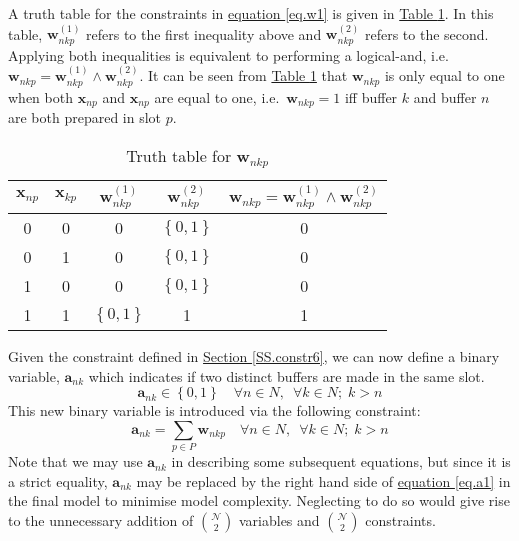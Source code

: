 A truth table for the constraints in 
\hyperref[eq.w1]{equation \ref*{eq.w1}} is given in
\hyperref[tbl.truthw]{Table \ref*{tbl.truthw}}.
In this table, $\boldsymbol{w}_{nkp}^{\left( 1 \right)}$ refers to the first
inequality above and $\boldsymbol{w}_{nkp}^{\left( 2 \right)}$ refers to the
second.
Applying both inequalities is equivalent to performing a logical-and, i.e.\
$\boldsymbol{w}_{nkp} = \boldsymbol{w}_{nkp}^{\left( 1 \right)} \land
\boldsymbol{w}_{nkp}^{\left( 2 \right)}$.
It can be seen from \hyperref[tbl.truthw]{Table \ref*{tbl.truthw}} that 
$\boldsymbol{w}_{nkp}$ is only equal to one when both $\boldsymbol{x}_{np}$ and
$\boldsymbol{x}_{np}$ are equal to one, i.e.\ $\boldsymbol{w}_{nkp} = 1$ iff
buffer $k$ and buffer $n$ are both prepared in slot $p$.
\begin{table}[h!]
    \centering
    \caption{Truth table for $\boldsymbol{w}_{nkp}$}
    \label{tbl.truthw}
    \begin{tabular}{c c | c c | c}
        $\boldsymbol{x}_{np}$ & $\boldsymbol{x}_{kp}$ &
        $\boldsymbol{w}_{nkp}^{\left( 1 \right)}$ &
        $\boldsymbol{w}_{nkp}^{\left( 2 \right)}$ &
        $\boldsymbol{w}_{nkp} = \boldsymbol{w}_{nkp}^{\left( 1 \right)}
            \land \boldsymbol{w}_{nkp}^{\left( 2 \right)}
        $\\ \hline
        0 & 0 & 0 & $\left\{ 0,1 \right\}$ & 0\\
        0 & 1 & 0 & $\left\{ 0,1 \right\}$ & 0\\
        1 & 0 & 0 & $\left\{ 0,1 \right\}$ & 0\\
        1 & 1 & $\left\{ 0,1 \right\}$ & 1 & 1\\
    \end{tabular}
\end{table}

Given the constraint defined in
\hyperref[SS.constr6]{Section \ref*{SS.constr6}}, we can now define a binary
variable, $\boldsymbol{a}_{nk}$ which indicates if two distinct buffers are
made in the same slot.
\begin{equation}
    \boldsymbol{a}_{nk} \in \left\{ 0, 1 \right\} \quad \forall n \in N,
    \enspace \forall k \in N; \; k > n
    \label{eq.a}
\end{equation}
This new binary variable is introduced via the following constraint:
\begin{equation}
    \boldsymbol{a}_{nk} = \sum_{p \in P} \boldsymbol{w}_{nkp} \quad
    \forall n \in N, \enspace \forall k \in N; \; k > n
    \label{eq.a1}
\end{equation}
Note that we may use $\boldsymbol{a}_{nk}$ in describing some subsequent
equations, but since it is a strict equality, $\boldsymbol{a}_{nk}$ may be 
replaced by the right hand side of \hyperref[eq.a1]{equation \ref*{eq.a1}} in the
final model to minimise model complexity.
Neglecting to do so would give rise to the unnecessary addition of
$\binom{\mathcal{N}}{2}$ variables and $\binom{\mathcal{N}}{2}$ constraints.

